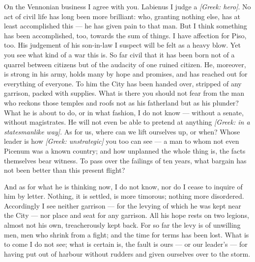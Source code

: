 

 On the Vennonian business I agree with you. Labienus I judge a \textit{[Greek: hero]}. No act of civil life has long been more brilliant: who, granting nothing else, has at least accomplished this --- he has given pain to that man. But I think something has been accomplished, too, towards the sum of things. I have affection for Piso, too. His judgement of his son-in-law I suspect will be felt as a heavy blow. Yet you see what kind of a war this is. So far civil that it has been born not of a quarrel between citizens but of the audacity of one ruined citizen. He, moreover, is strong in his army, holds many by hope and promises, and has reached out for everything of everyone. To him the City has been handed over, stripped of any garrison, packed with supplies. What is there you should not fear from the man who reckons those temples and roofs not as his fatherland but as his plunder? What he is about to do, or in what fashion, I do not know --- without a senate, without magistrates. He will not even be able to pretend at anything \textit{[Greek: in a statesmanlike way]}. As for us, where can we lift ourselves up, or when? Whose leader is how \textit{[Greek: unstrategic]} you too can see --- a man to whom not even Picenum was a known country; and how unplanned the whole thing is, the facts themselves bear witness. To pass over the failings of ten years, what bargain has not been better than this present flight?

 And as for what he is thinking now, I do not know, nor do I cease to inquire of him by letter. Nothing, it is settled, is more timorous; nothing more disordered. Accordingly I see neither garrison --- for the levying of which he was kept near the City --- nor place and seat for any garrison. All his hope rests on two legions, almost not his own, treacherously kept back. For so far the levy is of unwilling men, men who shrink from a fight; and the time for terms has been lost. What is to come I do not see; what is certain is, the fault is ours --- or our leader's --- for having put out of harbour without rudders and given ourselves over to the storm.

